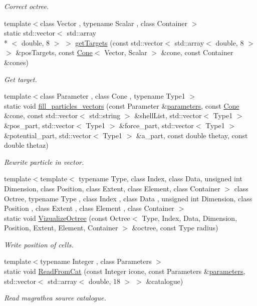 \begin{DoxyCompactItemize}
\begin{DoxyCompactList}\small\item\em Correct octree. \end{DoxyCompactList}\item 
{\footnotesize template$<$class Vector , typename Scalar , class Container $>$ }\\static std\-::vector$<$ std\-::array\\*
$<$ double, 8 $>$ $>$ \hyperlink{classMiscellaneous_a058e76b7b91f1b5bc7d4edc76a262ebd}{get\-Targets} (const std\-::vector$<$ std\-::array$<$ double, 8 $>$ $>$ \&pos\-Targets, const \hyperlink{exceptionCone}{Cone}$<$ Vector, Scalar $>$ \&cone, const Container \&cones)
\begin{DoxyCompactList}\small\item\em Get target. \end{DoxyCompactList}\item 
{\footnotesize template$<$class Parameter , class Cone , typename Type1 $>$ }\\static void \hyperlink{classMiscellaneous_af7fffb6f0670a220c5fbb681f8924907}{fill\-\_\-particles\-\_\-vectors} (const Parameter \&\hyperlink{rays_8h_ae1bc8b0b8c8b9f8e4cc61a5cc7c4ce9e}{parameters}, const \hyperlink{exceptionCone}{Cone} \&cone, const std\-::vector$<$ std\-::string $>$ \&shell\-List, std\-::vector$<$ Type1 $>$ \&pos\-\_\-part, std\-::vector$<$ Type1 $>$ \&force\-\_\-part, std\-::vector$<$ Type1 $>$ \&potential\-\_\-part, std\-::vector$<$ Type1 $>$ \&a\-\_\-part, const double thetay, const double thetaz)
\begin{DoxyCompactList}\small\item\em Rewrite particle in vector. \end{DoxyCompactList}\item 
{\footnotesize template$<$template$<$ typename Type, class Index, class Data, unsigned int Dimension, class Position, class Extent, class Element, class Container $>$ class Octree, typename Type , class Index , class Data , unsigned int Dimension, class Position , class Extent , class Element , class Container $>$ }\\static void \hyperlink{classMiscellaneous_a0bb2f69dd72da5316415e36c36d4322e}{Vizualize\-Octree} (const Octree$<$ Type, Index, Data, Dimension, Position, Extent, Element, Container $>$ \&octree, const Type radius)
\begin{DoxyCompactList}\small\item\em Write position of cells. \end{DoxyCompactList}\item 
{\footnotesize template$<$typename Integer , class Parameters $>$ }\\static void \hyperlink{classMiscellaneous_a6bf1192c0219a02dd019c6d451d6f705}{Read\-From\-Cat} (const Integer icone, const Parameters \&\hyperlink{rays_8h_ae1bc8b0b8c8b9f8e4cc61a5cc7c4ce9e}{parameters}, std\-::vector$<$ std\-::array$<$ double, 18 $>$ $>$ \&catalogue)
\begin{DoxyCompactList}\small\item\em Read magrathea source catalogue. \end{DoxyCompactList}\end{DoxyCompactItemize}


